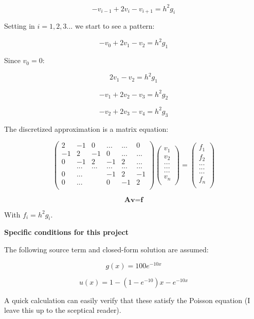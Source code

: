 \documentclass[11pt]{article}
\begin{document}
\begin{flushleft}
\begin{equation}
- v_{i-1} + 2 v_i - v_{i+1}= h^2 g_i 
\end{equation}

Setting in $i = 1,2,3...$ we start to see a pattern:

$$
- v_0 + 2 v_1 - v_2= h^2 g_1 
$$

Since $v_0 = 0$:

$$
2 v_1 - v_2= h^2 g_1 
$$

$$
- v_1 + 2 v_2 - v_3= h^2 g_2 
$$

$$
- v_2 + 2 v_3 - v_4= h^2 g_3 
$$

The discretized approximation is a matrix equation:

$$
\begin{pmatrix}
2 & -1 & 0 &...& ... & 0\\
-1 & 2 & -1 & 0 & ... & ...\\
0 & -1 & 2 & -1 & 2 & ...\\
& ... & ... & ... & ... & ...\\
0 & ... & & -1 & 2 & -1\\
0 & ... & & 0 & -1 & 2\\
\end{pmatrix}
\begin{pmatrix}
v_1\\
v_2\\
...\\
...\\
...\\
v_n\\
\end{pmatrix}
=
\begin{pmatrix}
f_1\\
f_2\\
...\\
...\\
...\\
f_n\\
\end{pmatrix}
$$

\begin{equation}
\textbf{A} \textbf{v} = \textbf{f}
\end{equation}

With $f_i = h^2 g_i$.
\end{flushleft}

\begin{flushleft}

\textbf{Specific conditions for this project}

The following source term and closed-form solution are assumed:

\begin{equation}
g(x) = 100e^{-10x}
\end{equation}

\begin{equation}
u(x) = 1 - (1-e^{-10})x - e^{-10x}
\end{equation}

A quick calculation can easily verify that these satisfy the Poisson equation (I leave this up to the sceptical reader).
\end{flushleft}
\end{document}
